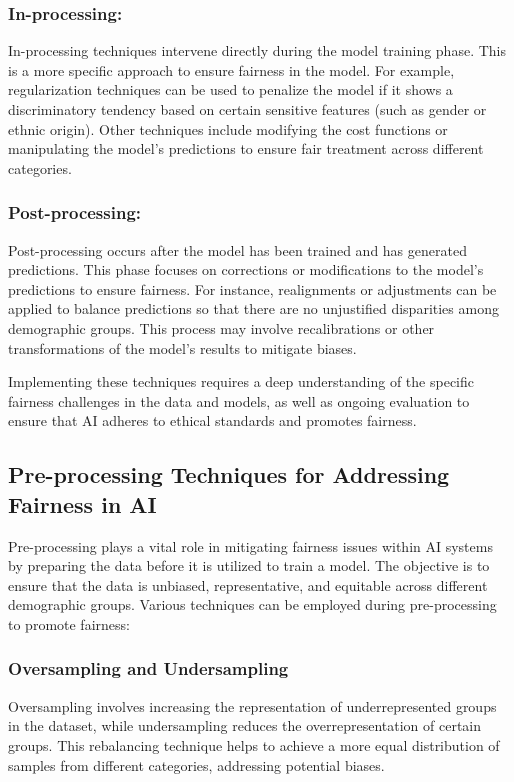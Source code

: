 \documentclass[12pt,a4paper,openright,twoside]{book}
\begin{document}
\subsubsection{In-processing:}
In-processing techniques intervene directly during the model training phase. This is a more specific approach to ensure fairness in the model. For example, regularization techniques can be used to penalize the model if it shows a discriminatory tendency based on certain sensitive features (such as gender or ethnic origin). Other techniques include modifying the cost functions or manipulating the model's predictions to ensure fair treatment across different categories.

\subsubsection{Post-processing:}
Post-processing occurs after the model has been trained and has generated predictions. This phase focuses on corrections or modifications to the model's predictions to ensure fairness. For instance, realignments or adjustments can be applied to balance predictions so that there are no unjustified disparities among demographic groups. This process may involve recalibrations or other transformations of the model's results to mitigate biases.

Implementing these techniques requires a deep understanding of the specific fairness challenges in the data and models, as well as ongoing evaluation to ensure that AI adheres to ethical standards and promotes fairness.

\subsection{Pre-processing Techniques for Addressing Fairness in AI}

Pre-processing plays a vital role in mitigating fairness issues within AI systems by preparing the data before it is utilized to train a model. The objective is to ensure that the data is unbiased, representative, and equitable across different demographic groups. Various techniques can be employed during pre-processing to promote fairness:

\subsubsection{Oversampling and Undersampling}
Oversampling involves increasing the representation of underrepresented groups in the dataset, while undersampling reduces the overrepresentation of certain groups. This rebalancing technique helps to achieve a more equal distribution of samples from different categories, addressing potential biases.
\end{document}
